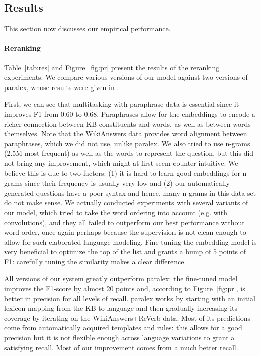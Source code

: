 \documentclass[runningheads,a4paper]{llncs}
\newcommand{\wk}{{\sc WikiAnswers}\xspace}
\newcommand{\wkrv}{{\sc WikiAnswers+ReVerb}\xspace}
\begin{document}
\subsection{Results}
This section now discusses our empirical performance.

\paragraph{Reranking}

Table~\ref{tab:res} and Figure~\ref{fig:pr} present the results of the reranking experiments.
We compare various versions of our model against two versions of {\sc paralex}, whose results were given in \cite{paralex}.

First, we can see that multitasking with paraphrase data is essential since it improves F1 from 0.60 to 0.68.
Paraphrases allow for the embeddings to encode a richer connection between KB constituents and words, as well as between words themselves.
Note that the \wk data provides word alignment between paraphrases, which we did not use, unlike {\sc paralex}.
We also tried to use n-grams (2.5M most frequent) as well as the words to represent the question, but this
did not bring any improvement, which might at first seem counter-intuitive. We believe this is due to two factors: (1) it is hard to learn good embeddings for n-grams since their frequency is usually very low and (2) our automatically generated questions have a poor syntax and hence, many n-grams in this data set do not make sense.
We actually conducted experiments with several variants of our model, which tried to take the word ordering into account (e.g. with convolutions), and they all failed to outperform our best performance without word order, once again perhaps because the supervision is not clean enough to allow for such elaborated language modeling.
Fine-tuning the embedding model is very beneficial to optimize the top of the list and grants a bump of 5 points of F1: carefully tuning the similarity makes a clear difference.

All versions of our system greatly outperform {\sc paralex}: the fine-tuned model improves the F1-score by almost 20 points and, according to Figure~\ref{fig:pr}, is better in precision for all levels of recall.
{\sc paralex} works by starting with an initial lexicon mapping from the KB to language and then gradually increasing its coverage by iterating  on the \wkrv data.
Most of its predictions come from automatically acquired templates and rules: this allows for a good precision but it is not flexible enough across language variations to grant a satisfying recall. Most of our improvement comes from a much better recall.
\end{document}

